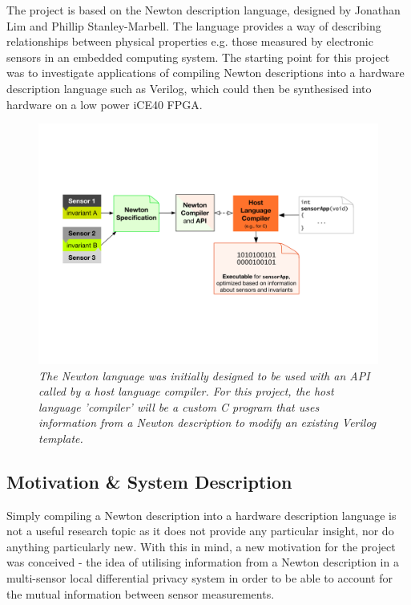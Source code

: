 \documentclass[pageno]{jpaper}
\begin{document}
The project is based on the Newton description language, designed by Jonathan Lim and Phillip Stanley-Marbell\cite{Newton}. The language provides a way of describing relationships between physical properties e.g. those measured by electronic sensors in an embedded computing system. The starting point for this project was to investigate applications of compiling Newton descriptions into a hardware description language such as Verilog, which could then be synthesised into hardware on a low power iCE40\cite{iCE40} FPGA.

\begin{figure}[H]
  \centering
    \includegraphics[width=\columnwidth]{images/Newton-and-C-Compiler-Interaction.png}
    \caption{\textit{The Newton language was initially designed to be used with an API called by a host language compiler\cite{Newton}. For this project, the host language 'compiler' will be a custom C program that uses information from a Newton description to modify an existing Verilog template.}}
    \label{fig:newton_compiler_interaction}
\end{figure}

\subsection{Motivation \& System Description}
Simply compiling a Newton description into a hardware description language is not a useful research topic as it does not provide any particular insight, nor do anything particularly new. With this in mind, a new motivation for the project was conceived - the idea of utilising information from a Newton description in a multi-sensor local differential privacy system in order to be able to account for the mutual information between sensor measurements.
\end{document}
